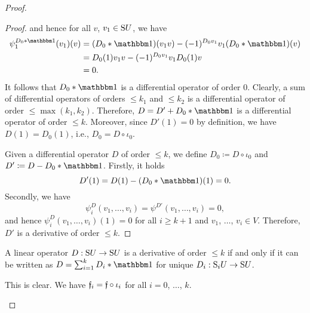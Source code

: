 \documentclass[\MainFolder/Text.tex]{subfiles}
\begin{document}
\begin{proof}
\begin{ProofList}
\begin{proof}
and hence for all $v$, $v_1\in \mathrm{S} U$, we have
\begin{align*}
\psi^{D_0\Star \Id}_1(v_1)(v) &= (D_0\Star \Id)(v_1 v) - (-1)^{D_0 v_1} v_1 (D_0\Star \Id)(v) \\
& = D_0(1)v_1 v - (-1)^{D_0 v_1} v_1 D_0(1) v \\
& = 0.
\end{align*}
It follows that $D_0 \Star \Id$ is a differential operator of order $0$. Clearly, a sum of differential operators of orders $\le k_1$ and $\le k_2$ is a differential operator of order $\le \max(k_1,k_2)$. Therefore, $D = D' + D_0\Star\Id$ is a differential operator of order $\le k$. Moreover, since $D'(1) = 0$ by definition, we have $D(1) = D_0(1)$, i.e., $D_0 = D \circ \iota_0$.

Given a differential operator $D$ of order $\le k$, we define $D_0\coloneqq D\circ\iota_0$ and $D'\coloneqq D - D_0\Star\Id$. Firstly, it holds 
\[ D'(1) = D(1) - (D_0\Star \Id)(1) = 0. \]
Secondly, we have 
\[ \psi_i^D(v_1,\dotsc,v_i) = \psi^{D'}(v_1,\dotsc,v_i) = 0, \]
and hence $\psi_i^D(v_1,\dotsc,v_i)(1) = 0$ for all $i\ge k+1$ and $v_1$, $\dotsc$, $v_i\in V$. Therefore, $D'$ is a derivative of order $\le k$.
\renewcommand{\qed}{\hfill\textit{(Subclaim) }$\square$}
\end{proof}
\begin{ProofProposition}\label{ProofProp:Filtr}
A linear operator $D: \mathrm{S} U \rightarrow \mathrm{S} U$ is a derivative of order $\le k$ if and only if it can be written as $D = \sum_{i=1}^k D_i \Star \Id$ for unique $D_i : \mathrm{S}_i U \rightarrow \mathrm{S} U$. 
\end{ProofProposition}
\item This is clear. We have $\mathfrak{f}_i = \mathfrak{f} \circ \iota_i$ for all $i=0$, $\dotsc$, $k$. \qedhere
\end{ProofList}
\end{proof}


\end{document}
